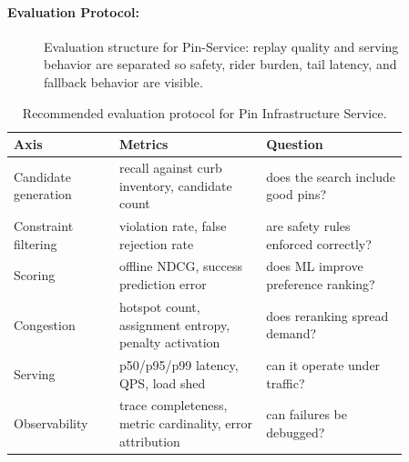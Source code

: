 \documentclass{article}
\begin{document}
\paragraph{Evaluation Protocol:}

\begin{figure}[t]
\centering
{}
\caption{Evaluation structure for Pin-Service: replay quality and serving behavior are separated so safety, rider burden, tail latency, and fallback behavior are visible.}
\label{fig:pin-eval}
\end{figure}

\begin{table}[t]
\centering
\caption{Recommended evaluation protocol for Pin Infrastructure Service.}
\label{tab:pin_protocol}
\begin{tabular}{@{}p{0.23\linewidth}p{0.32\linewidth}p{0.31\linewidth}@{}}
\toprule
\textbf{Axis} & \textbf{Metrics} & \textbf{Question}\\
\midrule
Candidate generation & recall against curb inventory, candidate count & does the search include good pins?\\
Constraint filtering & violation rate, false rejection rate & are safety rules enforced correctly?\\
Scoring & offline NDCG, success prediction error & does ML improve preference ranking?\\
Congestion & hotspot count, assignment entropy, penalty activation & does reranking spread demand?\\
Serving & p50/p95/p99 latency, QPS, load shed & can it operate under traffic?\\
Observability & trace completeness, metric cardinality, error attribution & can failures be debugged?\\
\bottomrule
\end{tabular}
\end{table}
\end{document}
